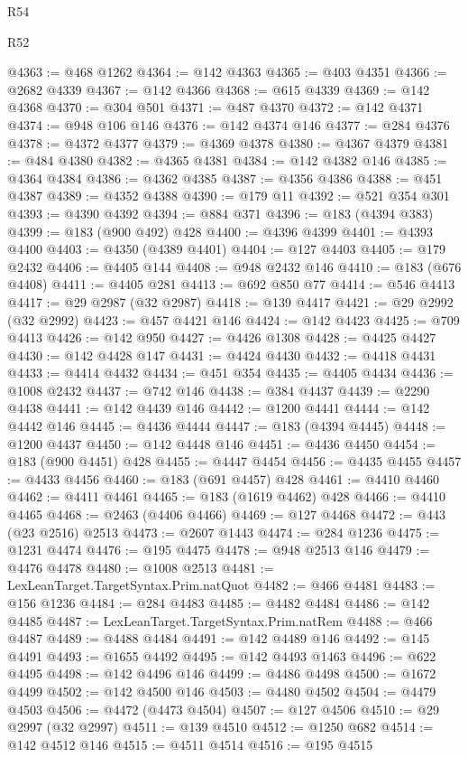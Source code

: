 \begin{lexlean}{R54}
\begin{lexlean}{R52}
\begin{coremodule}
{{{{{{{{{{{{{{{{{{{{{{{{{{{{{{{{{{{{{{{{{{{{{{{{{{{{{{{{{{{{{{{{{{{{{{{{{{{{{{{{{{{{{{{{{{{{{{{{{{{{{{{{{{{{{{{{{{{{{{{{{{{{{{{{{{{{{{{{{{{{{{{{{{{{{{{{{{{{{{{{{{{{{{{{{{{{{{{{{{{{{{{{{{{{{{{{{{{{{{@4363 := @468 @1262
@4364 := @142 @4363
@4365 := @403 @4351
@4366 := @2682 @4339
@4367 := @142 @4366
@4368 := @615 @4339
@4369 := @142 @4368
@4370 := @304 @501
@4371 := @487 @4370
@4372 := @142 @4371
@4374 := @948 @106 @146
@4376 := @142 @4374 @146
@4377 := @284 @4376
@4378 := @4372 @4377
@4379 := @4369 @4378
@4380 := @4367 @4379
@4381 := @484 @4380
@4382 := @4365 @4381
@4384 := @142 @4382 @146
@4385 := @4364 @4384
@4386 := @4362 @4385
@4387 := @4356 @4386
@4388 := @451 @4387
@4389 := @4352 @4388
@4390 := @179 @11
@4392 := @521 @354 @301
@4393 := @4390 @4392
@4394 := @884 @371
@4396 := @183 (@4394 @383)
@4399 := @183 (@900 @492) @428
@4400 := @4396 @4399
@4401 := @4393 @4400
@4403 := @4350 (@4389 @4401)
@4404 := @127 @4403
@4405 := @179 @2432
@4406 := @4405 @144
@4408 := @948 @2432 @146
@4410 := @183 (@676 @4408)
@4411 := @4405 @281
@4413 := @692 @850 @77
@4414 := @546 @4413
@4417 := @29 @2987 (@32 @2987)
@4418 := @139 @4417
@4421 := @29 @2992 (@32 @2992)
@4423 := @457 @4421 @146
@4424 := @142 @4423
@4425 := @709 @4413
@4426 := @142 @950
@4427 := @4426 @1308
@4428 := @4425 @4427
@4430 := @142 @4428 @147
@4431 := @4424 @4430
@4432 := @4418 @4431
@4433 := @4414 @4432
@4434 := @451 @354
@4435 := @4405 @4434
@4436 := @1008 @2432
@4437 := @742 @146
@4438 := @384 @4437
@4439 := @2290 @4438
@4441 := @142 @4439 @146
@4442 := @1200 @4441
@4444 := @142 @4442 @146
@4445 := @4436 @4444
@4447 := @183 (@4394 @4445)
@4448 := @1200 @4437
@4450 := @142 @4448 @146
@4451 := @4436 @4450
@4454 := @183 (@900 @4451) @428
@4455 := @4447 @4454
@4456 := @4435 @4455
@4457 := @4433 @4456
@4460 := @183 (@691 @4457) @428
@4461 := @4410 @4460
@4462 := @4411 @4461
@4465 := @183 (@1619 @4462) @428
@4466 := @4410 @4465
@4468 := @2463 (@4406 @4466)
@4469 := @127 @4468
@4472 := @443 (@23 @2516) @2513
@4473 := @2607 @1443
@4474 := @284 @1236
@4475 := @1231 @4474
@4476 := @195 @4475
@4478 := @948 @2513 @146
@4479 := @4476 @4478
@4480 := @1008 @2513
@4481 := LexLeanTarget.TargetSyntax.Prim.natQuot
@4482 := @466 @4481
@4483 := @156 @1236
@4484 := @284 @4483
@4485 := @4482 @4484
@4486 := @142 @4485
@4487 := LexLeanTarget.TargetSyntax.Prim.natRem
@4488 := @466 @4487
@4489 := @4488 @4484
@4491 := @142 @4489 @146
@4492 := @145 @4491
@4493 := @1655 @4492
@4495 := @142 @4493 @1463
@4496 := @622 @4495
@4498 := @142 @4496 @146
@4499 := @4486 @4498
@4500 := @1672 @4499
@4502 := @142 @4500 @146
@4503 := @4480 @4502
@4504 := @4479 @4503
@4506 := @4472 (@4473 @4504)
@4507 := @127 @4506
@4510 := @29 @2997 (@32 @2997)
@4511 := @139 @4510
@4512 := @1250 @682
@4514 := @142 @4512 @146
@4515 := @4511 @4514
@4516 := @195 @4515
}}}}}}}}}}}}}}}}}}}}}}}}}}}}}}}}}}}}}}}}}}}}}}}}}}}}}}}}}}}}}}}}}}}}}}}}}}}}}}}}}}}}}}}}}}}}}}}}}}}}}}}}}}}}}}}}}}}}}}}}}}}}}}}}}}}}}}}}}}}}}}}}}}}}}}}}}}}}}}}}}}}}}}}}}}}}}}}}}}}}}}}}}}}}}}}}}}}}}}
\end{coremodule}
\end{lexlean}
\end{lexlean}
